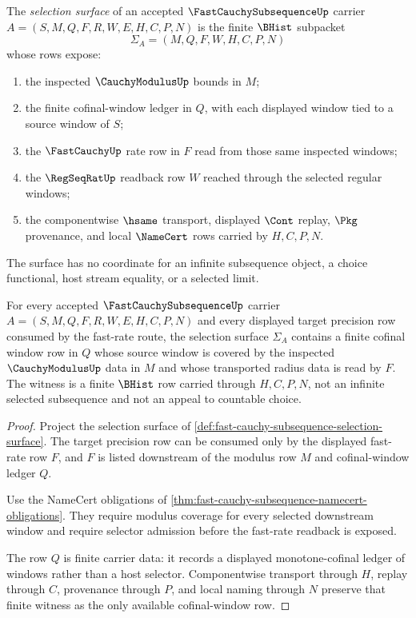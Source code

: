 \begin{definition}
\label{def:fast-cauchy-subsequence-selection-surface}
The \emph{selection surface} of an accepted $\FastCauchySubsequenceUp$ carrier $A=(S,M,Q,F,R,W,E,H,C,P,N)$ is the finite $\BHist$ subpacket
$$
\Sigma_A=(M,Q,F,W,H,C,P,N)
$$
whose rows expose:
\begin{enumerate}
\item the inspected $\CauchyModulusUp$ bounds in $M$;
\item the finite cofinal-window ledger in $Q$, with each displayed window tied to a source window of $S$;
\item the $\FastCauchyUp$ rate row in $F$ read from those same inspected windows;
\item the $\RegSeqRatUp$ readback row $W$ reached through the selected regular windows;
\item the componentwise $\hsame$ transport, displayed $\Cont$ replay, $\Pkg$ provenance, and local $\NameCert$ rows carried by $H,C,P,N$.
\end{enumerate}
The surface has no coordinate for an infinite subsequence object, a choice functional, host stream equality, or a selected limit.
\end{definition}

\begin{theorem}
\label{thm:fast-cauchy-subsequence-cofinal-window}
For every accepted $\FastCauchySubsequenceUp$ carrier $A=(S,M,Q,F,R,W,E,H,C,P,N)$ and every displayed target precision row consumed by the fast-rate route, the selection surface $\Sigma_A$ contains a finite cofinal window row in $Q$ whose source window is covered by the inspected $\CauchyModulusUp$ data in $M$ and whose transported radius data is read by $F$. The witness is a finite $\BHist$ row carried through $H,C,P,N$, not an infinite selected subsequence and not an appeal to countable choice.
\end{theorem}
\begin{proof}
Project the selection surface of \autoref{def:fast-cauchy-subsequence-selection-surface}. The target precision row can be consumed only by the displayed fast-rate row $F$, and $F$ is listed downstream of the modulus row $M$ and cofinal-window ledger $Q$.

Use the NameCert obligations of \autoref{thm:fast-cauchy-subsequence-namecert-obligations}. They require modulus coverage for every selected downstream window and require selector admission before the fast-rate readback is exposed.

The row $Q$ is finite carrier data: it records a displayed monotone-cofinal ledger of windows rather than a host selector. Componentwise transport through $H$, replay through $C$, provenance through $P$, and local naming through $N$ preserve that finite witness as the only available cofinal-window row.
\end{proof}

